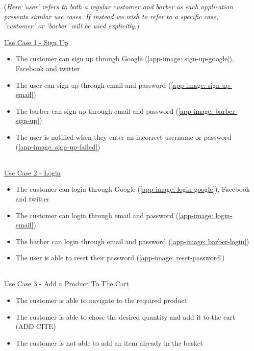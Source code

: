 \documentclass[12pt]{article}
\begin{document}
	\noindent
	(\emph{Here 'user' refers to both a regular customer and barber as each application presents similar use cases. If instead we wish to refer to a specific case, 'customer' or 'barber' will be used explicitly.})
	\newline
	
	\noindent
	\underline{Use Case 1 - Sign Up}
	
	\begin{itemize}
		\item The customer can sign up through Google (\autoref{app-image: sign-up-google}), Facebook and twitter
		\item The user can sign up through email and password (\autoref{app-image: sign-up-email})
		\item The barber can sign up through email and password (\autoref{app-image: barber-sign-up})
		\item The user is notified when they enter an incorrect username or password (\autoref{app-image: sign-up-failed})
	\end{itemize}
	
	\noindent
	\\	
	\underline{Use Case 2 - Login}
	
	\begin{itemize}
		\item The customer can login through Google (\autoref{app-image: login-google}), Facebook and twitter
		\item The customer can login through email and password (\autoref{app-image: login-email})
		\item The barber can login through email and password (\autoref{app-image: barber-login})
		\item The user is able to reset their password (\autoref{app-image: reset-password})
	\end{itemize}
	
	\noindent	
	\\
	\underline{Use Case 3 - Add a Product To The Cart}
	
	\begin{itemize}
		\item The customer is able to navigate to the required product
		\item The customer is able to chose the desired quantity and add it to the cart (ADD CITE)
		\item The customer is not able to add an item already in the basket
	\end{itemize}
	
\end{document}
